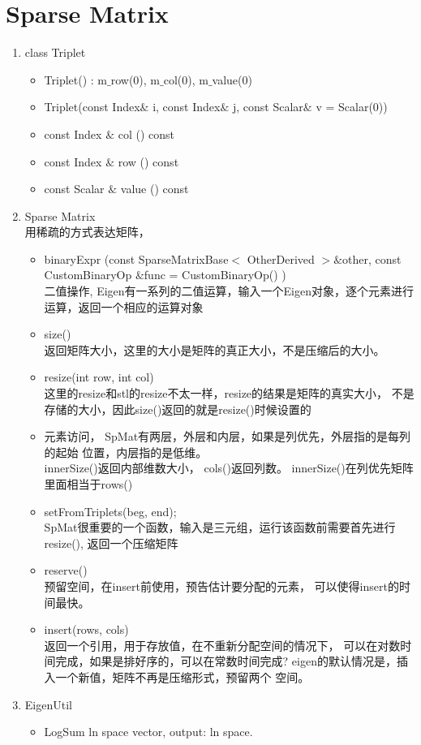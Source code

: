 \chapter{Sparse Matrix}
\begin{enumerate}
\item class Triplet
\begin{itemize}
\item Triplet() : m$\_$row(0), m$\_$col(0), m$\_$value(0)
\item Triplet(const Index$\&$ i, const Index$\&$ j, const Scalar$\&$ v = Scalar(0))
\item const Index $\&$ col () const
\item const Index $\&$ 	row () const
\item const Scalar $\&$ value () const
\end{itemize}
\item Sparse Matrix
\\用稀疏的方式表达矩阵，
\begin{itemize}
\item binaryExpr (const SparseMatrixBase$<$ OtherDerived $> \&$other,
const CustomBinaryOp $\&$func = CustomBinaryOp() )	
\\二值操作, Eigen有一系列的二值运算，输入一个Eigen对象，逐个元素进行
运算，返回一个相应的运算对象
\item size()
\\返回矩阵大小，这里的大小是矩阵的真正大小，不是压缩后的大小。
\item resize(int row, int col)
\\这里的resize和stl的resize不太一样，resize的结果是矩阵的真实大小，
不是存储的大小，因此size()返回的就是resize()时候设置的
\item 元素访问，
SpMat有两层，外层和内层，如果是列优先，外层指的是每列的起始
位置，内层指的是低维。
\\innerSize()返回内部维数大小， cols()返回列数。
innerSize()在列优先矩阵里面相当于rows()
\item setFromTriplets(beg, end);
\\SpMat很重要的一个函数，输入是三元组，运行该函数前需要首先进行
resize(), 返回一个压缩矩阵
\item reserve()
\\预留空间，在insert前使用，预告估计要分配的元素，
可以使得insert的时间最快。
\item insert(rows, cols)
\\返回一个引用，用于存放值，在不重新分配空间的情况下，
可以在对数时间完成，如果是排好序的，可以在常数时间完成?
eigen的默认情况是，插入一个新值，矩阵不再是压缩形式，预留两个
空间。
\end{itemize}
\item EigenUtil
\begin{itemize}
\item LogSum
\:ln space vector, output: ln space. 
\end{itemize}
\end{enumerate}
